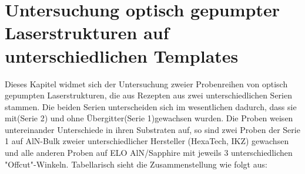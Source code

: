 \thispagestyle{fancy}

\section{Untersuchung optisch gepumpter Laserstrukturen auf unterschiedlichen Templates}

Dieses Kapitel widmet sich der Untersuchung zweier Probenreihen von optisch gepumpten Laserstrukturen, die aus Rezepten aus zwei unterschiedlichen Serien stammen. Die beiden Serien unterscheiden sich im wesentlichen dadurch, dass sie mit(Serie 2) und ohne Übergitter(Serie 1)gewachsen wurden. 
Die Proben weisen untereinander Unterschiede in ihren Substraten auf, so sind zwei Proben der Serie 1 auf AlN-Bulk zweier unterschiedlicher Hersteller (HexaTech, IKZ) gewachsen und alle anderen Proben auf ELO AlN/Sapphire mit jeweils 3 unterschiedlichen "Offcut"-Winkeln. Tabellarisch sieht die Zusammenstellung wie folgt aus: 

